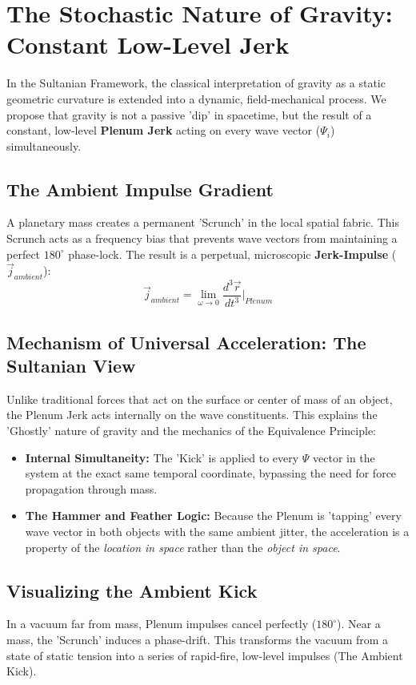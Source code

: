 \documentclass[11pt]{article}
\begin{document}
\section{The Stochastic Nature of Gravity: Constant Low-Level Jerk}

In the Sultanian Framework, the classical interpretation of gravity as a static geometric curvature is extended into a dynamic, field-mechanical process. We propose that gravity is not a passive 'dip' in spacetime, but the result of a constant, low-level \textbf{Plenum Jerk} acting on every wave vector ($\Psi_i$) simultaneously.

\subsection{The Ambient Impulse Gradient}
A planetary mass creates a permanent 'Scrunch' in the local spatial fabric. This Scrunch acts as a frequency bias that prevents wave vectors from maintaining a perfect $180^\circ$ phase-lock. The result is a perpetual, microscopic \textbf{Jerk-Impulse} ($\vec{j}_{ambient}$):
\begin{equation}
    \vec{j}_{ambient} = \lim_{\omega \to 0} \frac{d^3\vec{r}}{dt^3} \Big|_{Plenum}
\end{equation}

\subsection{Mechanism of Universal Acceleration: The Sultanian View}
Unlike traditional forces that act on the surface or center of mass of an object, the Plenum Jerk acts internally on the wave constituents. This explains the 'Ghostly' nature of gravity and the mechanics of the Equivalence Principle:
\begin{itemize}
    \item \textbf{Internal Simultaneity:} The 'Kick' is applied to every $\Psi$ vector in the system at the exact same temporal coordinate, bypassing the need for force propagation through mass.
    \item \textbf{The Hammer and Feather Logic:} Because the Plenum is 'tapping' every wave vector in both objects with the same ambient jitter, the acceleration is a property of the \textit{location in space} rather than the \textit{object in space}.
\end{itemize}

\subsection{Visualizing the Ambient Kick}
In a vacuum far from mass, Plenum impulses cancel perfectly ($180^\circ$). Near a mass, the 'Scrunch' induces a phase-drift. This transforms the vacuum from a state of static tension into a series of rapid-fire, low-level impulses (The Ambient Kick). 
\end{document}
